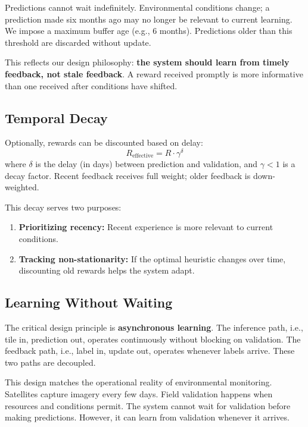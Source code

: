 \documentclass[11pt,a4paper]{article}
\begin{document}
Predictions cannot wait indefinitely. Environmental conditions change; a prediction made six months ago may no longer be relevant to current learning. We impose a maximum buffer age (e.g., 6 months). Predictions older than this threshold are discarded without update.

This reflects our design philosophy: \textbf{the system should learn from timely feedback, not stale feedback}. A reward received promptly is more informative than one received after conditions have shifted.

\subsection{Temporal Decay}

Optionally, rewards can be discounted based on delay:
\begin{equation}
R_{\text{effective}} = R \cdot \gamma^{\delta}
\label{eq:decay}
\end{equation}
where $\delta$ is the delay (in days) between prediction and validation, and $\gamma < 1$ is a decay factor. Recent feedback receives full weight; older feedback is down-weighted.

This decay serves two purposes:
\begin{enumerate}
    \item \textbf{Prioritizing recency:} Recent experience is more relevant to current conditions.
    \item \textbf{Tracking non-stationarity:} If the optimal heuristic changes over time, discounting old rewards helps the system adapt.
\end{enumerate}

\subsection{Learning Without Waiting}

The critical design principle is \textbf{asynchronous learning}. The inference path, i.e., tile in, prediction out, operates continuously without blocking on validation. The feedback path, i.e., label in, update out, operates whenever labels arrive. These two paths are decoupled.

This design matches the operational reality of environmental monitoring. Satellites capture imagery every few days. Field validation happens when resources and conditions permit. The system cannot wait for validation before making predictions. However, it can learn from validation whenever it arrives.
\end{document}
